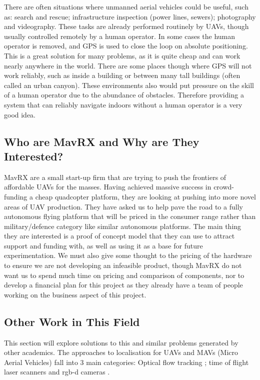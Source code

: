 \documentclass[]{article}
\begin{document}
{There are often situations where unmanned aerial vehicles could be useful, such as: search and rescue; infrastructure inspection (power lines, sewers); photography and videography. These tasks are already performed routinely by \ac{UAV}s, though usually controlled remotely by a human operator. In some cases the human operator is removed, and \ac{GPS} is used to close the loop on absolute positioning. This is a great solution for many problems, as it is quite cheap and can work nearly anywhere in the world. There are some places though where \ac{GPS} will not work reliably, such as inside a building or between many tall buildings (often called an urban canyon). These environments also would put pressure on the skill of a human operator due to the abundance of obstacles. Therefore providing a system that can reliably navigate indoors without a human operator is a very good idea. 

\subsection{Who are MavRX and Why are They Interested?} %
\label{sub:why_are_mavrx_interested_in_this_work_}

MavRX are a small start-up firm that are trying to push the frontiers of affordable \ac{UAV}s for the masses. Having achieved massive success in crowd-funding a cheap quadcopter platform, they are looking at pushing into more novel areas of \ac{UAV} production. They have asked us to help pave the road to a fully autonomous flying platform that will be priced in the consumer range rather than military/defence category like similar autonomous platforms. The main thing they are interested is a proof of concept model that they can use to attract support and funding with, as well as using it as a base for future experimentation. We must also give some thought to the pricing of the hardware to ensure we are not developing an infeasible product, though MavRX do not want us to spend much time on pricing and comparison of components, nor to develop a financial plan for this project as they already have a team of people working on the business aspect of this project.  

\subsection{Other Work in This Field} %
\label{sub:other_work_in_this_field}

This section will explore solutions to this and similar problems generated by other academics. The approaches to localisation for \ac{UAV}s and \ac{MAV}s (Micro Aerial Vehicles) fall into 3 main categories: Optical flow tracking \cite{DBLP:conf/icra/GrabeBG12}; time of flight laser scanners \cite{Bry2012} and rgb-d cameras \cite{Shen2012}.

}
\end{document}
